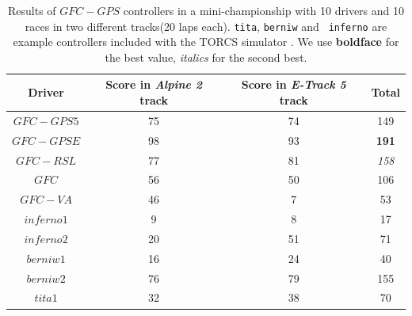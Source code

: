 \documentclass[10pt,journal,compsoc]{IEEEtran}
\begin{document}
\begin{table}[ht]
	\centering
	{\scriptsize
		\caption{ Results of $GFC-GPS$ controllers in a mini-championship with 10 drivers and 10
			races in two different tracks(20 laps each). {\tt tita}, {\tt berniw} and {\tt
				inferno} are example controllers included with the TORCS
			simulator \cite{torcs4}. We use {\bf boldface}
                      for the best value, {\em italics} for the second
                    best. }
		{
			\begin{tabular}{|c|c|c||c|}
				\hline
				Driver&Score in \textit{Alpine 2} track &Score in \textit{E-Track 5} track &Total\\
				\hline
				\hline
				
			$GFC-GPS5$&	75	&74&	149\\
			$GFC-GPSE$&	98	&93&	{\bf 191}\\
			$GFC-RSL$&	77	&81&	{\em 158}\\
			$GFC$	&	56	&50&	106\\
			$GFC-VA$	&	46	&7&		53\\
			$inferno1$&	9	&8&		17\\
			$inferno2$&		20	&51&	71\\
			$berniw1$&	16	&24&	40\\
			$berniw2$&	76	&79&	155\\
			$tita1$&32	&38&	70\\		
				\hline
				
			\end{tabular}
		}\label{tab:RSresults}
	}
\end{table}
%
\end{document}
